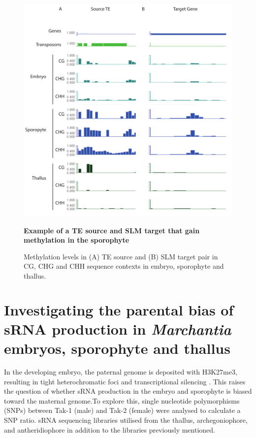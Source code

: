 \begin{figure}[htbp!] 
\centering    
    \includegraphics[width=1\textwidth]{Chapter3/Figs/Figure6_pairs_examples.pdf}
\caption{\textbf{Example of a TE  source and SLM target that gain methylation in the sporophyte}}
\label{fig:TE_SLM_pairs}
\captionsetup{font=small}
    \caption*{Methylation levels in (A) TE source and (B) SLM target pair in CG, CHG and CHH sequence contexts in embryo, sporophyte and thallus.}
\end{figure}

\section{Investigating the parental bias of sRNA production in \textit{Marchantia} embryos, sporophyte and thallus}

In the developing embryo, the paternal genome is deposited with H3K27me3, resulting in tight heterochromatic foci and transcriptional silencing \citep{RN160}. This raises the question of whether sRNA production in the embryo and sporophyte is biased toward the maternal genome.To explore this, single nucleotide polymorphisms (SNPs) between Tak-1 (male) and Tak-2 (female) were analysed to calculate a SNP ratio. sRNA sequencing libraries utilised from the thallus, archegoniophore, and antheridiophore \citep{RN265} in addition to the libraries previously mentioned.

